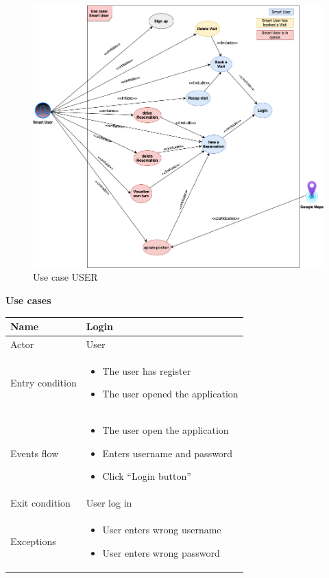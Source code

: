 \begin{figure}[h]
	\caption{Use case USER}
	\label{fig:UML}
	
	\centering
	\includegraphics[width=1\textwidth, height=1\textwidth]{diagrams/UseCaseUser.png}
	
\end{figure}

\addvspace{1cm} 
{\normalsize \textbf{Use cases}}
\par \medskip

\begin{tabular}{|p{5cm} | p{7cm} | }
\hline
Name & Login \\
\hline
Actor & User \\
\hline
Entry condition &
\begin{itemize}
\item The user has register
\item The user opened the application
\end{itemize} \\
\hline
Events flow & 
\begin{itemize}
	\item The user open the application
	\item Enters username and password
	\item Click “Login button”
\end{itemize} \\
\hline
Exit condition & User log in \\
\hline 
Exceptions &
\begin{itemize}
	\item User enters wrong username
	\item User enters wrong password
\end{itemize} \\
\hline
\end{tabular}

